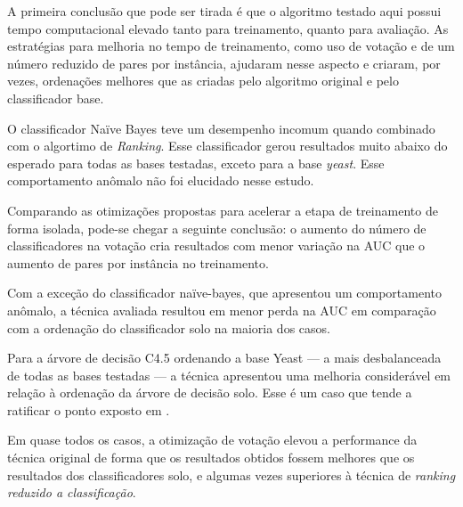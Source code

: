 A primeira conclusão que pode ser tirada é que o algoritmo testado aqui possui tempo computacional elevado tanto para treinamento, quanto para avaliação. As estratégias para melhoria no tempo de treinamento, como uso de votação e de um número reduzido de pares por instância, ajudaram nesse aspecto e criaram, por vezes, ordenações melhores que as criadas pelo algoritmo original e pelo classificador base.

O classificador Naïve Bayes teve um desempenho incomum quando combinado com o algortimo de \emph{Ranking}. Esse classificador gerou resultados muito abaixo do esperado para todas as bases testadas, exceto para a base \emph{yeast}. Esse comportamento anômalo não foi elucidado nesse estudo.

Comparando as otimizações propostas para acelerar a etapa de treinamento de forma isolada, pode-se chegar a seguinte conclusão: o aumento do número de classificadores na votação cria resultados com menor variação na AUC que o aumento de pares por instância no treinamento.

Com a exceção do classificador naïve-bayes, que apresentou um comportamento anômalo, a técnica avaliada resultou em menor perda na AUC em comparação com a ordenação do classificador solo na maioria dos casos.

Para a árvore de decisão C4.5 ordenando a base Yeast --- a mais desbalanceada de todas as bases testadas --- a técnica apresentou uma melhoria considerável em relação à ordenação da árvore de decisão solo. Esse é um caso que tende a ratificar o ponto exposto em \cite{langford08}.

Em quase todos os casos, a otimização de votação elevou a performance da técnica original de forma que os resultados obtidos fossem melhores que os resultados dos classificadores solo, e algumas vezes superiores à técnica de \emph{ranking reduzido a classificação}.